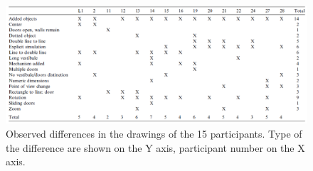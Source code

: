 \documentclass[12pt]{article}
\begin{document}
\begin{figure}[H]
  \centering
  \includegraphics[width=0.8\linewidth]{images/table_differences_of_solutions.PNG}
  \caption{\label{fig:summary_differences}Observed differences in the drawings of the 15 participants. Type of the difference are shown on the Y axis, participant number on the X axis.
}
  
\end{figure}     
\end{document}
